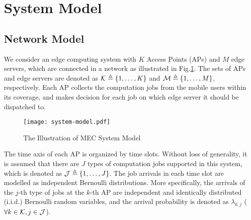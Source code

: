 \section{System Model}
\subsection{Network Model}
We consider an edge computing system with $K$ Access Points (APs) and $M$ edge servers, which are connected in a network as illustrated in Fig.\ref{fig:system}.
The sets of APs and edge servers are denoted as $\mathcal{K} \triangleq \{1,\dots,K\}$ and $\mathcal{M} \triangleq \{1,\dots,M\}$, respectively.
Each AP collects the computation jobs from the mobile users within its coverage, and makes decision for each job on which edge server it should be dispatched to.

\begin{figure}[ht]
    \centering
    \texttt{[image: system-model.pdf]}
    \caption{The Illustration of MEC System Model}
    \label{fig:system}
\end{figure}

The time axis of each AP is organized by time slots.
Without loss of generality, it is assumed that there are $J$ types of computation jobs supported in this system, which is denoted as $\mathcal{J} \triangleq \{1,\dots,J\}$.
The job arrivals in each time slot are modelled as independent Bernoulli distributions.
More specifically, the arrivals of the $j$-th type of jobs at the $k$-th AP are independent and identically distributed (i.i.d.) Bernoulli random variables, and the arrival probability is denoted as $\lambda_{k,j}$ ($\forall k\in\mathcal{K}, j\in\mathcal{J}$).


